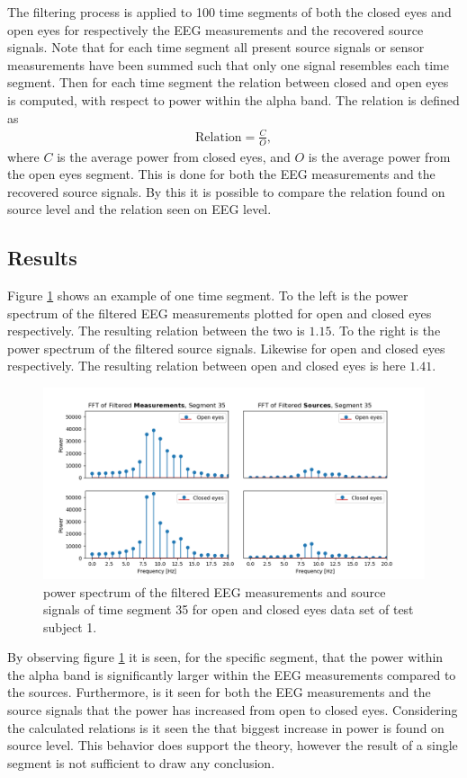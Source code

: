 The filtering process is applied to 100 time segments of both the closed eyes and open eyes for respectively the EEG measurements and the recovered source signals. 
Note that for each time segment all present source signals or sensor measurements have been summed such that only one signal resembles each time segment.
Then for each time segment the relation between closed and open eyes is computed, with respect to power within the alpha band. 
The relation is defined as 
\begin{align*}
\text{Relation} = \frac{C}{O}, 
\end{align*}
where $C$ is the average power from closed eyes, and $O$ is the average power from the open eyes segment. 
This is done for both the EEG measurements and the recovered source signals. 
By this it is possible to compare the relation found on source level and the relation seen on EEG level.  

\subsection{Results}
Figure \ref{fig:dft_2} shows an example of one time segment. 
To the left is the power spectrum of the filtered EEG measurements plotted for open and closed eyes respectively. 
The resulting relation between the two is $1.15$. 
To the right is the power spectrum of the filtered source signals. 
Likewise for open and closed eyes respectively. 
The resulting relation between open and closed eyes is here $1.41$.  
\begin{figure}[H]
\centering
\includegraphics[scale=0.5]{figures/ch_7/FFT_plot.png}
\caption{power spectrum of the filtered EEG measurements and source signals of time segment 35 for open and closed eyes data set of test subject 1.}
\label{fig:dft_2}
\end{figure}
\noindent
By observing figure \ref{fig:dft_2} it is seen, for the specific segment, that the power within the alpha band is significantly larger within the EEG measurements compared to the sources. 
Furthermore, is it seen for both the EEG measurements and the source signals that the power has increased from open to closed eyes. 
Considering the calculated relations is it seen the that biggest increase in power is found on source level. 
This behavior does support the theory, however the result of a single segment is not sufficient to draw any conclusion.          

